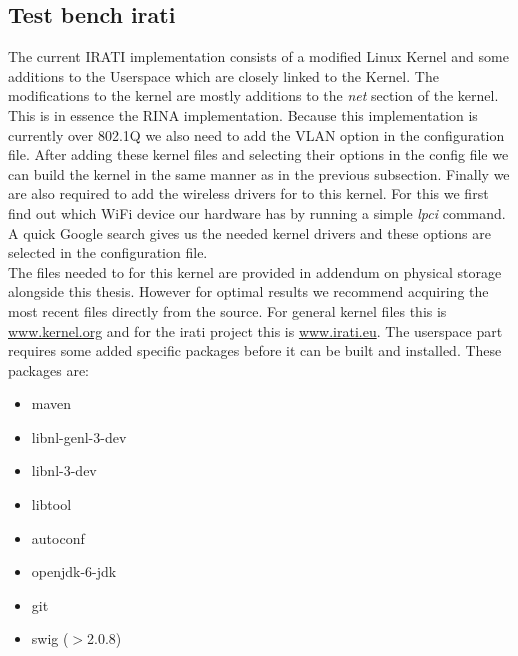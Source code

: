 \subsection{Test bench irati}
\label{ssec:test-bench-irati}


The current IRATI implementation consists of a modified Linux Kernel and some additions to the Userspace which are closely linked to the Kernel. The modifications to the kernel are mostly additions to the \emph{net} section of the kernel. This is in essence the RINA implementation. Because this implementation is currently over 802.1Q we also need to add the VLAN option in the configuration file. After adding these kernel files and selecting their options in the config file we can build the kernel in the same manner as in the previous subsection. Finally we are also required to add the wireless drivers for to this kernel. For this we first find out which WiFi device our hardware has by running a simple \emph{lpci} command. A quick Google search gives us the needed kernel drivers and these options are selected in the configuration file. 
\\
The files needed to for this kernel are provided in addendum on physical storage alongside this thesis. However for optimal results we recommend acquiring the most recent files directly from the source. For general kernel files this is \url{www.kernel.org} and for the irati project this is \url{www.irati.eu}. 
\npar
The userspace part requires some added specific packages before it can be built and installed. These packages are:

\begin{itemize}
	\item maven
	\item libnl-genl-3-dev
	\item libnl-3-dev
	\item libtool
	\item autoconf
	\item openjdk-6-jdk
	\item git
	\item swig ($>$2.0.8)
\end{itemize}

